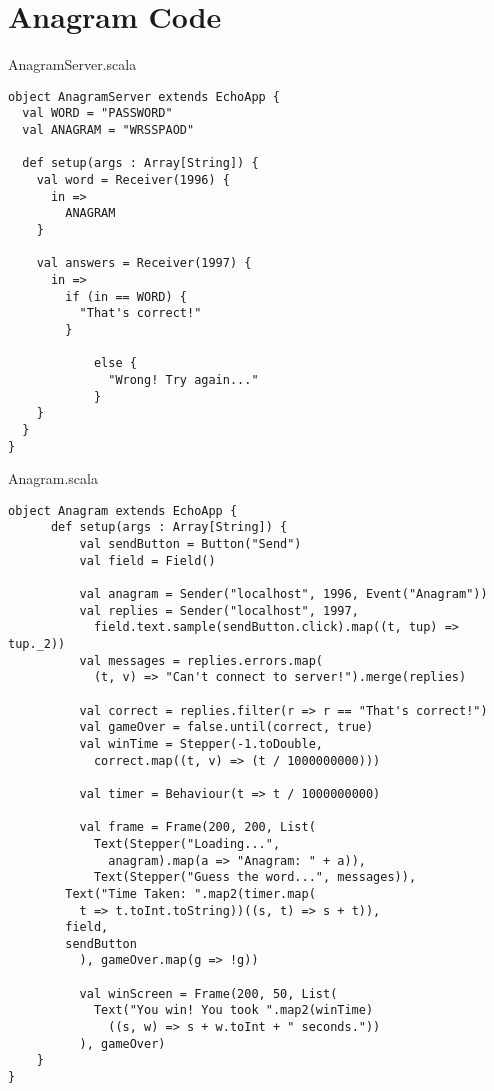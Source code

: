 \chapter{Anagram Code}

AnagramServer.scala

\begin{verbatim}
object AnagramServer extends EchoApp {
  val WORD = "PASSWORD"
  val ANAGRAM = "WRSSPAOD"

  def setup(args : Array[String]) {	
    val word = Receiver(1996) {
      in =>
        ANAGRAM
    }

  	val answers = Receiver(1997) {
  	  in =>
  	    if (in == WORD) {
  	      "That's correct!"
  	    }

  			else {
  			  "Wrong! Try again..."
  			}
  	}
  }
}
\end{verbatim}

Anagram.scala

\begin{verbatim}
object Anagram extends EchoApp {
	  def setup(args : Array[String]) {
		  val sendButton = Button("Send")
		  val field = Field()
		  
		  val anagram = Sender("localhost", 1996, Event("Anagram"))
		  val replies = Sender("localhost", 1997, 
		    field.text.sample(sendButton.click).map((t, tup) => tup._2))
		  val messages = replies.errors.map(
		    (t, v) => "Can't connect to server!").merge(replies)

		  val correct = replies.filter(r => r == "That's correct!")
		  val gameOver = false.until(correct, true)
		  val winTime = Stepper(-1.toDouble, 
		    correct.map((t, v) => (t / 1000000000)))

		  val timer = Behaviour(t => t / 1000000000)

		  val frame = Frame(200, 200, List(
		    Text(Stepper("Loading...", 
		      anagram).map(a => "Anagram: " + a)),
		    Text(Stepper("Guess the word...", messages)),
        Text("Time Taken: ".map2(timer.map(
          t => t.toInt.toString))((s, t) => s + t)),
        field,
        sendButton
		  ), gameOver.map(g => !g))

		  val winScreen = Frame(200, 50, List(
		    Text("You win! You took ".map2(winTime)
		      ((s, w) => s + w.toInt + " seconds."))
		  ), gameOver)
	}
}
\end{verbatim}